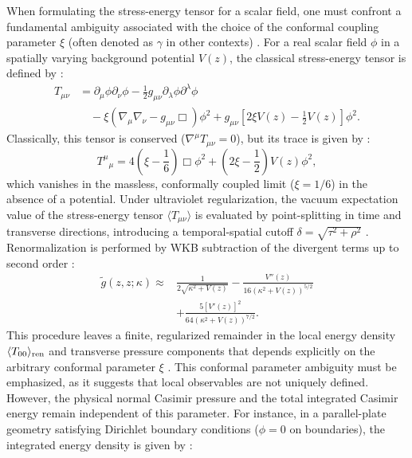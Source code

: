 \documentclass[12pt,letterpaper]{article}
\newcommand{\revision}[1]{#1}
\begin{document}
\revision{When formulating the stress-energy tensor for a scalar field, one must confront a fundamental ambiguity associated with the choice of the conformal coupling parameter $\xi$ (often denoted as $\gamma$ in other contexts) \cite{milton2016}. For a real scalar field $\phi$ in a spatially varying background potential $V(z)$, the classical stress-energy tensor is defined by \cite{milton2016}:
\begin{align}
T_{\mu\nu} &= \partial_\mu \phi \partial_\nu \phi - \frac{1}{2} g_{\mu\nu} \partial_\lambda \phi \partial^\lambda \phi \nonumber\\
&\quad - \xi \left( \nabla_\mu \nabla_\nu - g_{\mu\nu} \Box \right) \phi^2 + g_{\mu\nu} \left[ 2\xi V(z) - \frac{1}{2} V(z) \right] \phi^2.
\label{eq:conformal_tensor_classical}
\end{align}
Classically, this tensor is conserved ($\nabla^\mu T_{\mu\nu} = 0$), but its trace is given by \cite{milton2016}:
\begin{equation}
T^\mu{}_\mu = 4 \left( \xi - \frac{1}{6} \right) \Box \phi^2 + \left(2\xi - \frac{1}{2}\right) V(z) \phi^2,
\label{eq:conformal_trace_classical}
\end{equation}
which vanishes in the massless, conformally coupled limit ($\xi = 1/6$) in the absence of a potential. Under ultraviolet regularization, the vacuum expectation value of the stress-energy tensor $\langle T_{\mu\nu} \rangle$ is evaluated by point-splitting in time and transverse directions, introducing a temporal-spatial cutoff $\delta = \sqrt{\tau^2 + \rho^2}$ \cite{milton2016}. Renormalization is performed by WKB subtraction of the divergent terms up to second order \cite{milton2016}:
\begin{equation}
\begin{aligned}
\tilde{g}(z,z; \kappa) \approx & \frac{1}{2\sqrt{\kappa^2 + V(z)}} - \frac{V''(z)}{16(\kappa^2 + V(z))^{5/2}} \\
& + \frac{5 [V'(z)]^2}{64(\kappa^2 + V(z))^{7/2}}.
\end{aligned}
\label{eq:wkb_subtraction}
\end{equation}
This procedure leaves a finite, regularized remainder in the local energy density $\langle T_{00} \rangle_{\rm ren}$ and transverse pressure components that depends explicitly on the arbitrary conformal parameter $\xi$ \cite{milton2016}. This conformal parameter ambiguity must be emphasized, as it suggests that local observables are not uniquely defined. However, the physical normal Casimir pressure and the total integrated Casimir energy remain independent of this parameter. For instance, in a parallel-plate geometry satisfying Dirichlet boundary conditions ($\phi = 0$ on boundaries), the integrated energy density is given by \cite{milton2016,brownmaclay1969}:
}
\end{document}
